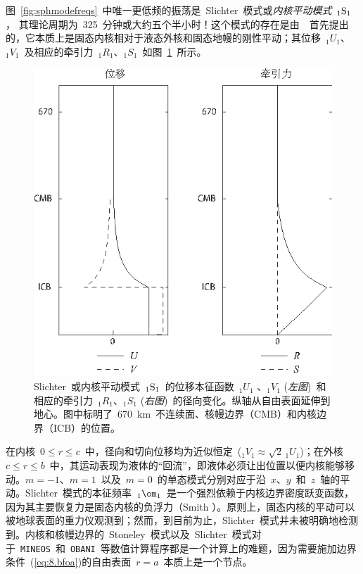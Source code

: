{图~\ref{fig:sphmodefreqs}~中唯一更低频的振荡是~Slichter~模式或{\em 内核平动模式\/}~${}_1{\rm S}_1$，
%
%
%
%
其理论周期为~325~分钟或大约五个半小时！这个模式的存在是由~\textcite{slichter61}~首先提出的，它本质上是固态内核相对于液态外核和固态地幔的刚性平动；其位移~${}_1U_1$、${}_1V_1$~及相应的牵引力~${}_1R_1$、${}_1S_1$~如图~\ref{fig:1S1}~所示。
\begin{figure}[!t]
\begin{center}
\includegraphics{../figures/chap08/fig19.eps}
\end{center}
\caption[1S1 mode]{\label{fig:1S1}
Slichter~或内核平动模式~${}_1{\rm S}_1$~的位移本征函数~${}_1U_1$ 、${}_1V_1$ ({\em 左图\/})~和相应的牵引力~${}_1R_1$、${}_1S_1$ ({\em 右图\/})~的径向变化。纵轴从自由表面延伸到地心。图中标明了~670~km~不连续面、核幔边界（CMB）和内核边界（ICB）的位置。
}
\end{figure}
在内核~$0\leq r\leq c$~中，径向和切向位移均为近似恒定~(${}_1V_1\approx\sqrt{2}\,{}_1U_1$)；在外核~$c\leq r\leq b$~中，其运动表现为液体的“回流”，即液体必须让出位置以便内核能够移动。$m=-1$、$m=1$~以及~$m=0$~的单态模式分别对应于沿~$x$、$y$~和~$z$~轴的平动。Slichter~模式的本征频率~${}_1\om_1$~是一个强烈依赖于内核边界密度跃变函数，因为其主要恢复力是固态内核的负浮力（Smith \citeyear{smith76}）。原则上，固态内核的平动可以被地球表面的重力仪观测到；然而，到目前为止，Slichter~模式并未被明确地检测到。内核和核幔边界的~Stoneley~模式以及~Slichter~模式对于~{\tt MINEOS}~和~{\tt OBANI}~等数值计算程序都是一个计算上的难题，因为需要施加边界条件~(\ref{eq:8.bfoa})的自由表面~$r=a$~本质上是一个节点。

}

